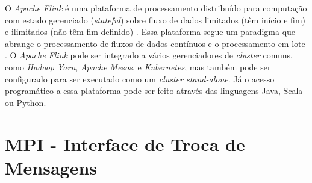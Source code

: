 % 
% 
% 
% 



O \emph{Apache Flink} é uma plataforma de processamento distribuído para
computação com estado gerenciado (\emph{stateful}) sobre fluxo de dados
limitados (têm início e fim) e ilimitados (não têm fim definido)
\cite{ApacheFlink2020}.
Essa plataforma segue um paradigma que abrange o processamento de fluxos de
dados contínuos e o processamento em lote \cite{Carbone2015,Lopez2018}.
O \emph{Apache Flink} pode ser integrado a vários gerenciadores de
\emph{cluster} comuns, como \emph{Hadoop Yarn}, \emph{Apache Mesos}, e
\emph{Kubernetes}, mas também pode ser configurado para ser executado como um
\emph{cluster stand-alone}.
Já o acesso programático a essa plataforma pode ser feito através das linguagens
Java, Scala ou Python.

\section{MPI - Interface de Troca de Mensagens}

